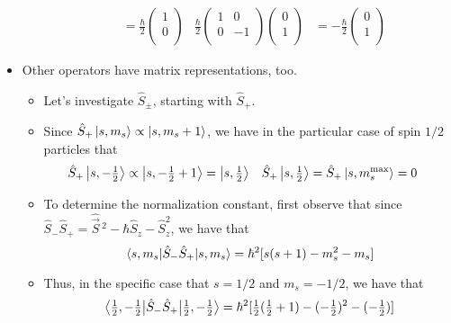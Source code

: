 \documentclass[../notes.tex]{subfiles}
\begin{document}
\begin{itemize}
\begin{itemize}
\begin{align*}
            &= \frac{\hbar}{2}
            \begin{pmatrix}
                1\\
                0\\
            \end{pmatrix}&
            \frac{\hbar}{2}
            \begin{pmatrix}
                1 & 0\\
                0 & -1\\
            \end{pmatrix}
            \begin{pmatrix}
                0\\
                1\\
            \end{pmatrix}
            &= -\frac{\hbar}{2}
            \begin{pmatrix}
                0\\
                1\\
            \end{pmatrix}
        \end{align*}
    \end{itemize}
    \item Other operators have matrix representations, too.
    \begin{itemize}
        \item Let's investigate $\hat{S}_\pm$, starting with $\hat{S}_+$.
        \item Since $\hat{S}_+\ket{s,m_s}\propto\ket{s,m_s+1}$, we have in the particular case of spin $1/2$ particles that
        \begin{align*}
            \hat{S}_+\ket{s,-\tfrac{1}{2}} &\propto \ket{s,-\tfrac{1}{2}+1} = \ket{s,\tfrac{1}{2}}&
            \hat{S}_+\ket{s,\tfrac{1}{2}} &= \hat{S}_+\ket{s,m_s^\text{max}} = 0
        \end{align*}
        \item To determine the normalization constant, first observe that since $\hat{S}_-\hat{S}_+=\hat{\vec{S}}{\,}^2-\hbar\hat{S}_z-\hat{S}_z^2$, we have that
        \begin{equation*}
            \ev{\hat{S}_-\hat{S}_+}{s,m_s} = \hbar^2[s(s+1)-m_s^2-m_s]
        \end{equation*}
        \item Thus, in the specific case that $s=1/2$ and $m_s=-1/2$, we have that 
        \begin{equation*}
            \ev{\hat{S}_-\hat{S}_+}{\tfrac{1}{2},-\tfrac{1}{2}} = \hbar^2[\tfrac{1}{2}(\tfrac{1}{2}+1)-(-\tfrac{1}{2})^2-(-\tfrac{1}{2})]

\end{equation*}
\end{itemize}
\end{itemize}
\end{document}
